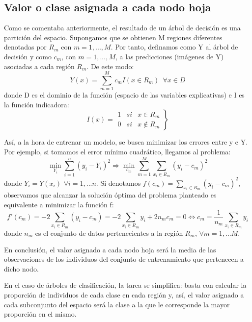 \documentclass[12pt,twoside]{article}
\begin{document}
\subsection{Valor o clase asignada a cada nodo hoja}
Como se comentaba anteriormente, el resultado de un árbol de decisión es una partición del espacio. Supongamos que se obtienen M regiones diferentes denotadas por $R_{m}$ con $m = 1, ..., M$. Por tanto, definamos como Y al árbol de decisión y como $c_m$, con $m = 1,...,M$, a las predicciones (imágenes de Y) asociadas a cada región $R_m$. De este modo:
\begin{equation*}
Y(x) = \sum^M_{m = 1} c_{m}I(x \in R_m) \, \, \, \forall x \in D
\end{equation*}
donde D es el dominio de la función (espacio de las variables explicativas) e I es la función indicadora:
\begin{equation*}
I(x) = 
\left.
\begin{array}{ccc}
1 & si & x \in R_m \\
0 & si & x \not\in R_m 
\end{array}
\right\}
\end{equation*}


Así, a la hora de entrenar un modelo, se busca minimizar los errores entre y e Y. Por ejemplo, si tomamos el error mínimo cuadrático, llegamos al problema:
\begin{equation*}
\min_{Y_i} \sum_{i=1}^n (y_i - Y_i)^2 \Rightarrow \min_{c_m} \sum_{m = 1}^M \sum_{x_i \in R_m} (y_i - c_m)^2
\end{equation*}
donde $Y_i = Y(x_i) \, \, \forall i=1,...n$. Si denotamos $f(c_m) = \sum_{x_i \in R_m} (y_i - c_m)^2$, observamos que alcanzar la solución óptima del problema planteado es equivalente a minimizar la función f:
\begin{equation*}
f'(c_m) = -2 \sum_{x_i \in R_m} (y_i - c_m) = -2 \sum_{x_i \in R_m}y_i + 2n_mc_m = 0 \Leftrightarrow c_m = \frac{1}{n_m} \sum_{x_i \in R_m}y_i
\end{equation*}
donde $n_m$ es el conjunto de datos pertenecientes a la región $R_m$, $\forall m = 1,...M$.

En conclusión, el valor asignado a cada nodo hoja será la media de las observaciones de los individuos del conjunto de entrenamiento que pertenecen a dicho nodo.

En el caso de árboles de clasificación, la tarea se simplifica: basta con calcular la proporción de individuos de cada clase en cada región y, así, el valor asignado a cada subconjunto del espacio será la clase a la que le corresponde la mayor proporción en el mismo.
\end{document}
